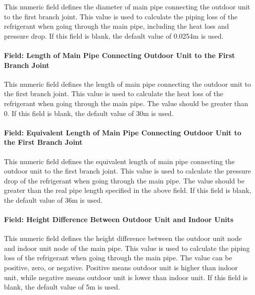 This numeric field defines the diameter of main pipe connecting the outdoor unit to the first branch joint. This value is used to calculate the piping loss of the refrigerant when going through the main pipe, including the heat loss and pressure drop. If this field is blank, the default value of 0.0254m is used.

\paragraph{Field: Length of Main Pipe Connecting Outdoor Unit to the First Branch Joint}\label{field-length-of-main-pipe-connecting-outdoor-unit-to-indoor-units}

This numeric field defines the length of main pipe connecting the outdoor unit to the first branch joint. This value is used to calculate the heat loss of the refrigerant when going through the main pipe. The value should be greater than 0. If this field is blank, the default value of 30m is used.

\paragraph{Field: Equivalent Length of Main Pipe Connecting Outdoor Unit to the First Branch Joint}\label{field-equivalent-length-of-main-pipe-connecting-outdoor-unit-to-indoor-units}

This numeric field defines the equivalent length of main pipe connecting the outdoor unit to the first branch joint. This value is used to calculate the pressure drop of the refrigerant when going through the main pipe. The value should be greater than the real pipe length specified in the above field. If this field is blank, the default value of 36m is used.

\paragraph{Field: Height Difference Between Outdoor Unit and Indoor Units}\label{field-height-difference-between-outdoor-unit-and-indoor-units}

This numeric field defines the height difference between the outdoor unit node and indoor unit node of the main pipe. This value is used to calculate the piping loss of the refrigerant when going through the main pipe. The value can be positive, zero, or negative. Positive means outdoor unit is higher than indoor unit, while negative means outdoor unit is lower than indoor unit. If this field is blank, the default value of 5m is used.

